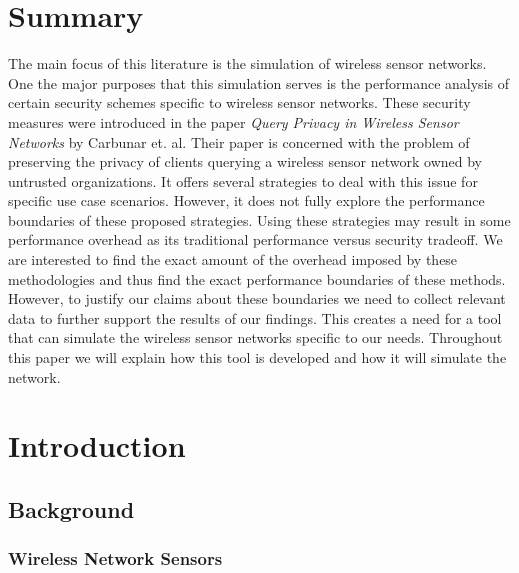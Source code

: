 \documentclass[11pt, titlepage, oneside]{article}
\begin{document}
  
\raggedright
\maketitle  
{} 
\section*{Summary} 
The main focus of this literature is the simulation of wireless sensor networks. One the major purposes that this simulation serves is the performance analysis of certain security schemes specific to wireless sensor networks. These security measures were introduced in the paper {\it Query Privacy in Wireless Sensor Networks} by Carbunar et. al. Their paper is concerned with the problem of preserving the privacy of clients querying a wireless sensor network owned by untrusted organizations. It offers several strategies to deal with this issue for specific use case scenarios. However, it does not fully explore the performance boundaries of these proposed strategies. Using these strategies may
result in some performance overhead as its traditional performance versus security tradeoff. We are
interested to find the exact amount of the overhead imposed by these methodologies and thus find the
exact performance boundaries of these methods. However, to justify our claims about  these boundaries we need to collect relevant data to further support the results of our findings. This creates a need for a tool that can simulate the wireless sensor networks specific to our needs. Throughout this paper we will explain how this tool is developed and how it will simulate the network.
\newpage 
\setcounter{tocdepth}{2} 
\tableofcontents 
\newpage 
\listoffigures 
\newpage 
\renewcommand\lstlistingname{Block} 
\renewcommand{\lstlistlistingname}{List of Blocks} 
\lstlistoflistings 
\newpage 
\cleardoublepage 
{} 
\section{Introduction} 
\subsection{Background} 
 
\subsubsection{Wireless Network Sensors} 
 
\end{document}

